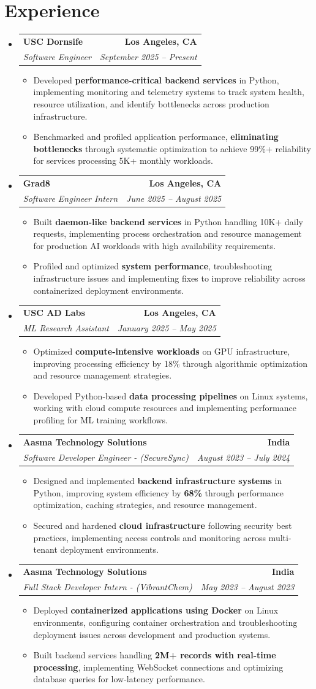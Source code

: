 \documentclass[letterpaper,10pt]{article}
\makeatletter
\newcommand{\resumeItem}[1]{\item\small{{#1 \vspace{-2pt}}}}
\newcommand{\resumeSubheading}[4]{\vspace{-1pt}\item\begin{tabular*}{1.0\textwidth}[t]{l@{\extracolsep{\fill}}r}\textbf{#1} & \textbf{\small #2} \\\textit{\small#3} & \textit{\small #4} \\\end{tabular*}\vspace{-2pt}}
\newcommand{\resumeSubHeadingListStart}{\begin{itemize}[leftmargin=0.0in, label={}]}
\newcommand{\resumeSubHeadingListEnd}{\end{itemize}}
\newcommand{\resumeItemListStart}{\begin{itemize}[leftmargin=0.15in,label=\textbullet,itemsep=2pt,topsep=0pt,parsep=0pt,partopsep=0pt]}
\newcommand{\resumeItemListEnd}{\end{itemize}\vspace{-4pt}}
\makeatother
\begin{document}
\section{Experience}
\resumeSubHeadingListStart
\resumeSubheading{USC Dornsife}{Los Angeles, CA}{Software Engineer}{September 2025 -- Present}
\resumeItemListStart
\resumeItem{Developed \textbf{performance-critical backend services} in Python, implementing monitoring and telemetry systems to track system health, resource utilization, and identify bottlenecks across production infrastructure.}
\resumeItem{Benchmarked and profiled application performance, \textbf{eliminating bottlenecks} through systematic optimization to achieve 99\%+ reliability for services processing 5K+ monthly workloads.}
\resumeItemListEnd
\resumeSubheading{Grad8}{Los Angeles, CA}{Software Engineer Intern}{June 2025 -- August 2025}
\resumeItemListStart
\resumeItem{Built \textbf{daemon-like backend services} in Python handling 10K+ daily requests, implementing process orchestration and resource management for production AI workloads with high availability requirements.}
\resumeItem{Profiled and optimized \textbf{system performance}, troubleshooting infrastructure issues and implementing fixes to improve reliability across containerized deployment environments.}
\resumeItemListEnd
\resumeSubheading{USC AD Labs}{Los Angeles, CA}{ML Research Assistant}{January 2025 -- May 2025}
\resumeItemListStart
\resumeItem{Optimized \textbf{compute-intensive workloads} on GPU infrastructure, improving processing efficiency by 18\% through algorithmic optimization and resource management strategies.}
\resumeItem{Developed Python-based \textbf{data processing pipelines} on Linux systems, working with cloud compute resources and implementing performance profiling for ML training workflows.}
\resumeItemListEnd
\resumeSubheading{Aasma Technology Solutions}{India}{Software Developer Engineer - (SecureSync)}{August 2023 -- July 2024}
\resumeItemListStart
\resumeItem{Designed and implemented \textbf{backend infrastructure systems} in Python, improving system efficiency by \textbf{68\%} through performance optimization, caching strategies, and resource management.}
\resumeItem{Secured and hardened \textbf{cloud infrastructure} following security best practices, implementing access controls and monitoring across multi-tenant deployment environments.}
\resumeItemListEnd
\resumeSubheading{Aasma Technology Solutions}{India}{Full Stack Developer Intern - (VibrantChem)}{May 2023 -- August 2023}
\resumeItemListStart
\resumeItem{Deployed \textbf{containerized applications using Docker} on Linux environments, configuring container orchestration and troubleshooting deployment issues across development and production systems.}
\resumeItem{Built backend services handling \textbf{2M+ records with real-time processing}, implementing WebSocket connections and optimizing database queries for low-latency performance.}
\resumeItemListEnd
\resumeSubHeadingListEnd
\vspace{-14pt}
\end{document}
